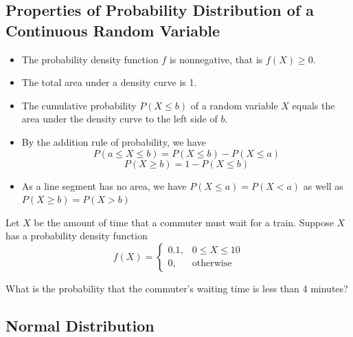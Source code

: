 \hypertarget{properties-of-probability-distribution-of-a-continuous-random-variable}{%
\subsection{Properties of Probability Distribution of a Continuous
Random
Variable}\label{properties-of-probability-distribution-of-a-continuous-random-variable}}

\begin{itemize}
\item
  The probability density function \(f\) is nonnegative, that is
  \(f(X)\ge 0\).
\item
  The total area under a density curve is 1.
\item
  The cumulative probability \(P(X\le b)\) of a random variable \(X\)
  equals the area under the density curve to the left side of \(b\).
\item
  By the addition rule of probability, we have
    \[P(a\le X\le b)=P(X\le b)-P(X\le a)\]
    \[P(X\ge b)=1-P(X\le b)\]
\item
  As a line segment has no area, we have \(P(X\le a)=P(X< a)\) as well
  as \(P(X\ge b)=P(X>b)\)
\end{itemize}

\begin{example}

Let \(X\) be the amount of time that a commuter must wait for a train.
Suppose \(X\) has a probability density function \[
f(X)=
\begin{cases}
  0.1, & 0\leq X\leq 10\\
  0,   & \text{otherwise}
\end{cases}
\]

What is the probability that the commuter's waiting time is less than 4
minutes?

\end{example}

\vspace*{4\baselineskip}

\hypertarget{normal-distribution}{%
\subsection{Normal Distribution}\label{normal-distribution}}

